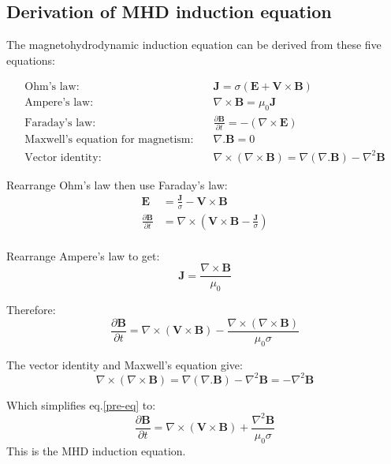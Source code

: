 \documentclass[12pt]{article}
\begin{document}
\begin{appendices}
\section{Derivation of MHD induction equation \label{app:mhd}}
The magnetohydrodynamic induction equation can be derived from these five equations:

\begin{align}
    \text{Ohm's law:} &\quad \textbf{J}=\sigma(\textbf{E}+\textbf{V}\times\textbf{B}) \\
    \text{Ampere's law:} &\quad \nabla\times\textbf{B}=\mu_0\textbf{J} \\
    \text{Faraday's law:} &\quad \frac{\partial\textbf{B}}{\partial t}=-(\nabla\times\textbf{E}) \\
    \text{Maxwell's equation for magnetism:} &\quad \nabla .  \textbf{B}=0 \\
    \text{Vector identity:} &\quad \nabla\times(\nabla\times\textbf{B})=\nabla(\nabla . \textbf{B})-\nabla^2\textbf{B}
\end{align}

\noindent Rearrange  Ohm's law then use Faraday's law:
\begin{align}
    \textbf{E} &= \frac{\textbf{J}}{\sigma}-\textbf{V}\times\textbf{B} \\
    \frac{\partial\textbf{B}}{\partial t} &= \nabla\times\left(\textbf{V}\times\textbf{B}-\frac{\textbf{J}}{\sigma}\right) \\
\end{align}

\noindent Rearrange Ampere's law to get:
\begin{equation}
    \textbf{J}=\frac{\nabla\times\textbf{B}}{\mu_0}
\end{equation}

\noindent Therefore:
\begin{equation}
    \frac{\partial\textbf{B}}{\partial t} = \nabla\times(\textbf{V}\times\textbf{B})-\frac{\nabla\times(\nabla\times\textbf{B})}{\mu_0\sigma}
    \label{pre-eq}
\end{equation}

\noindent The vector identity and Maxwell's equation give:
\begin{equation}
    \nabla\times(\nabla\times\textbf{B})=\nabla(\nabla . \textbf{B})-\nabla^2\textbf{B}=-\nabla^2\textbf{B}
\end{equation}

Which simplifies eq.\ref{pre-eq} to:
\begin{equation}
    \frac{\partial\textbf{B}}{\partial t}=\nabla\times(\textbf{V}\times\textbf{B})+\frac{\nabla^2\textbf{B}}{\mu_0\sigma}
\end{equation}
This is the MHD induction equation.

\end{appendices}

\end{document}
